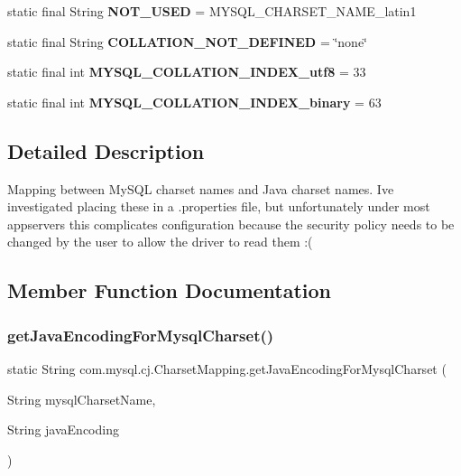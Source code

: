 \begin{DoxyCompactItemize}
static final String {\bfseries N\+O\+T\+\_\+\+U\+S\+ED} = M\+Y\+S\+Q\+L\+\_\+\+C\+H\+A\+R\+S\+E\+T\+\_\+\+N\+A\+M\+E\+\_\+latin1
\item 
\mbox{\label{classcom_1_1mysql_1_1cj_1_1_charset_mapping_a9eb3ea147d46febde2f4ce191db98728}} 
static final String {\bfseries C\+O\+L\+L\+A\+T\+I\+O\+N\+\_\+\+N\+O\+T\+\_\+\+D\+E\+F\+I\+N\+ED} = \char`\"{}none\char`\"{}
\item 
\mbox{\label{classcom_1_1mysql_1_1cj_1_1_charset_mapping_ae2239d1170e14b584ff627fe59a2b4be}} 
static final int {\bfseries M\+Y\+S\+Q\+L\+\_\+\+C\+O\+L\+L\+A\+T\+I\+O\+N\+\_\+\+I\+N\+D\+E\+X\+\_\+utf8} = 33
\item 
\mbox{\label{classcom_1_1mysql_1_1cj_1_1_charset_mapping_a8c5acfb9b1dcf8c7835a9c006280c3fc}} 
static final int {\bfseries M\+Y\+S\+Q\+L\+\_\+\+C\+O\+L\+L\+A\+T\+I\+O\+N\+\_\+\+I\+N\+D\+E\+X\+\_\+binary} = 63
\end{DoxyCompactItemize}


\subsection{Detailed Description}
Mapping between My\+S\+QL charset names and Java charset names. I\textquotesingle{}ve investigated placing these in a .properties file, but unfortunately under most appservers this complicates configuration because the security policy needs to be changed by the user to allow the driver to read them \+:( 

\subsection{Member Function Documentation}
\mbox{\label{classcom_1_1mysql_1_1cj_1_1_charset_mapping_adcf497aaea2895c19f34687c266346e8}} 
\subsubsection{\texorpdfstring{get\+Java\+Encoding\+For\+Mysql\+Charset()}{getJavaEncodingForMysqlCharset()}}
{\footnotesize\ttfamily static String com.\+mysql.\+cj.\+Charset\+Mapping.\+get\+Java\+Encoding\+For\+Mysql\+Charset (\begin{DoxyParamCaption}\item[{String}]{mysql\+Charset\+Name,  }\item[{String}]{java\+Encoding }\end{DoxyParamCaption})\hspace{0.3cm}{\ttfamily [static]}}

